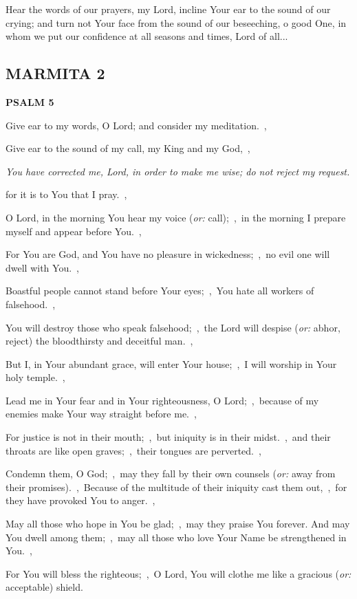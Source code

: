 \documentclass[12pt,twoside,a5paper]{article}
\newcommand{\marmita}[1]{\subsection*{MARMITA {#1}}}
\newcommand{\psalm}[1]{\textbf{PSALM {#1}}}
\newcommand{\qanona}[1]{{\liturgicalhint{Qanona.} \emph{#1}}}
\newcommand{\slota}[1]{\liturgicalhint{Slota.} #1}
\newcommand{\translationoption}[1]{\emph{or:} #1}
\begin{document}
\slota{Hear the words of our prayers, my Lord, incline Your ear to the sound of our crying; and turn not Your face from the sound of our beseeching, o good One, in whom we put our confidence at all seasons and times, Lord of all...}

\marmita{2}

\psalm{5}

\begin{normalparskip}
  Give ear to my words, O Lord; and consider my meditation.~\sep

  Give ear to the sound of my call, my King and my God,~\sep

  \qanona{You have corrected me, Lord, in order to make me wise; do not reject my request.}

  for it is to You that I pray.~\sep

  O Lord, in the morning You hear my voice (\translationoption{call});~\sep\ in the morning I prepare myself and appear before You.~\sep

  For You are God, and You have no pleasure in wickedness;~\sep\ no evil one will dwell with You.~\sep

  Boastful people cannot stand before Your eyes;~\sep\ You hate all workers of falsehood.~\sep

  You will destroy those who speak falsehood;~\sep\ the Lord will despise (\translationoption{abhor, reject}) the bloodthirsty and deceitful man.~\sep

  But I, in Your abundant grace, will enter Your house;~\sep\ I will worship in Your holy temple.~\sep

  Lead me in Your fear and in Your righteousness, O Lord;~\sep\ because of my enemies make Your way straight before me.~\sep

  For justice is not in their mouth;~\sep\ but iniquity is in their midst.~\sep\ and their throats are like open graves;~\sep\ their tongues are perverted.~\sep

  Condemn them, O God;~\sep\ may they fall by their own counsels (\translationoption{away from their promises}).~\sep\ Because of the multitude of their iniquity cast them out,~\sep\ for they have provoked You to anger.~\sep

  May all those who hope in You be glad;~\sep\ may they praise You forever. And may You dwell among them;~\sep\ may all those who love Your Name be strengthened in You.~\sep

  For You will bless the righteous;~\sep\ O Lord, You will clothe me like a gracious (\translationoption{acceptable}) shield.
\end{normalparskip}
\end{document}
